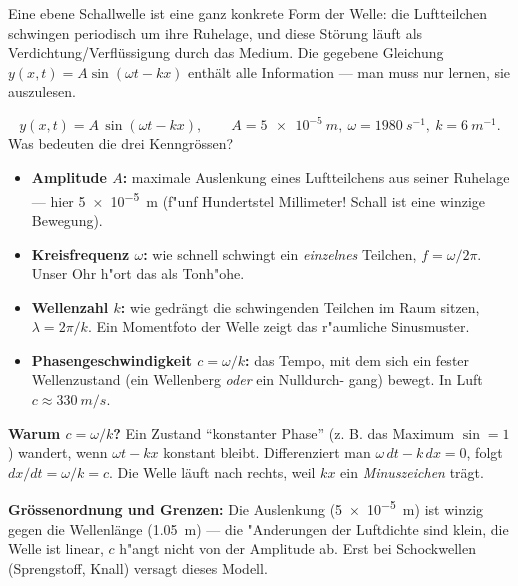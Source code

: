 

Eine ebene Schallwelle ist eine ganz konkrete Form der Welle: die
Luftteilchen schwingen periodisch um ihre Ruhelage, und diese Störung
läuft als Verdichtung/Verflüssigung durch das Medium. Die gegebene Gleichung
$y(x,t)=A\sin(\omega t-kx)$ enthält alle Information --- man muss nur lernen,
sie auszulesen.

\begin{werkzeugkasten}
\begin{equation}
  y(x,t)=A\,\sin(\omega t-kx),\qquad
  A=\qty{5e-5}{m},\ \omega=\qty{1980}{s^{-1}},\ k=\qty{6}{m^{-1}}.
\end{equation}
Was bedeuten die drei Kenngrössen?

\begin{itemize}
  \item \textbf{Amplitude $A$:} maximale Auslenkung eines Luftteilchens aus
        seiner Ruhelage --- hier \qty{5e-5}{m} (f"unf Hundertstel Millimeter!
        Schall ist eine winzige Bewegung).
  \item \textbf{Kreisfrequenz $\omega$:} wie schnell schwingt ein
        \emph{einzelnes} Teilchen, $f=\omega/2\pi$. Unser Ohr h"ort das als
        Tonh"ohe.
  \item \textbf{Wellenzahl $k$:} wie gedrängt die schwingenden Teilchen im
        Raum sitzen, $\lambda=2\pi/k$. Ein Momentfoto der Welle zeigt das
        r"aumliche Sinusmuster.
  \item \textbf{Phasengeschwindigkeit $c=\omega/k$:} das Tempo, mit dem sich
        ein fester Wellenzustand (ein Wellenberg \emph{oder} ein Nulldurch-
        gang) bewegt. In Luft $c\approx\qty{330}{m/s}$.
\end{itemize}

\textbf{Warum $c=\omega/k$?} Ein Zustand ``konstanter Phase'' (z. B. das
Maximum $\sin=1$) wandert, wenn $\omega t-kx$ konstant bleibt. Differenziert
man $\omega\,dt-k\,dx=0$, folgt $dx/dt=\omega/k=c$. Die Welle läuft nach
rechts, weil $kx$ ein \emph{Minuszeichen} trägt.

\textbf{Grössenordnung und Grenzen:} Die Auslenkung (\qty{5e-5}{m}) ist winzig
gegen die Wellenlänge (\qty{1.05}{m}) --- die "Anderungen der Luftdichte sind
klein, die Welle ist linear, $c$ h"angt nicht von der Amplitude ab. Erst bei
Schockwellen (Sprengstoff, Knall) versagt dieses Modell.
\end{werkzeugkasten}

